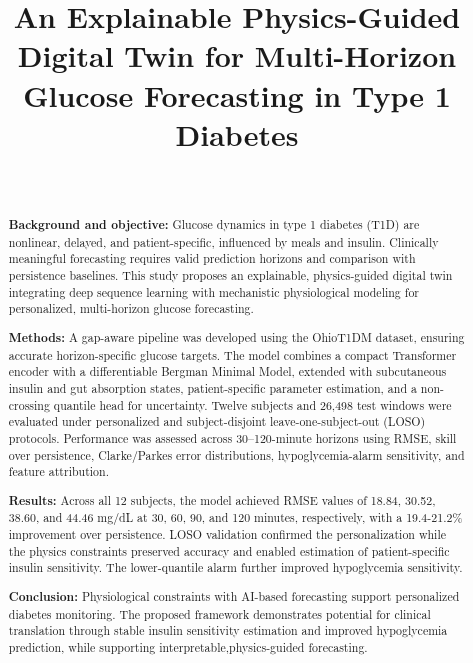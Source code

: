 \documentclass[journal]{IEEEtran}
\begin{document}
\raggedbottom
\setlength{\emergencystretch}{1.5em}

\title{An Explainable Physics-Guided Digital Twin for Multi-Horizon Glucose Forecasting in Type 1 Diabetes}

\author{
\\
}


\maketitle

\begin{abstract}
\textbf{Background and objective:} Glucose dynamics in type 1 diabetes (T1D) are nonlinear, delayed, and patient-specific, influenced by meals and insulin. Clinically meaningful forecasting requires valid prediction horizons and comparison with persistence baselines. This study proposes an explainable, physics-guided digital twin integrating deep sequence learning with mechanistic physiological modeling for personalized, multi-horizon glucose forecasting.

\textbf{Methods:} A gap-aware pipeline was developed using the OhioT1DM dataset, ensuring accurate horizon-specific glucose targets. The model combines a compact Transformer encoder with a differentiable Bergman Minimal Model, extended with subcutaneous insulin and gut absorption states, patient-specific parameter estimation, and a non-crossing quantile head for uncertainty. Twelve subjects and 26,498 test windows were evaluated under personalized and subject-disjoint leave-one-subject-out (LOSO) protocols. Performance was assessed across 30–120-minute horizons using RMSE, skill over persistence, Clarke/Parkes error distributions, hypoglycemia-alarm sensitivity, and feature attribution.

\textbf{Results:} Across all 12 subjects, the model achieved RMSE values of 18.84, 30.52, 38.60, and 44.46 mg/dL at 30, 60, 90, and 120 minutes, respectively, with a 19.4-21.2\% improvement over persistence. LOSO validation confirmed the personalization while the physics constraints preserved accuracy and enabled estimation of patient-specific insulin sensitivity. The lower-quantile alarm further improved hypoglycemia sensitivity.

\textbf{Conclusion:} Physiological constraints with AI-based forecasting support personalized diabetes monitoring. The proposed framework demonstrates potential for clinical translation through stable insulin sensitivity estimation and improved hypoglycemia prediction, while supporting interpretable,physics-guided forecasting.
\end{abstract}
\end{document}
